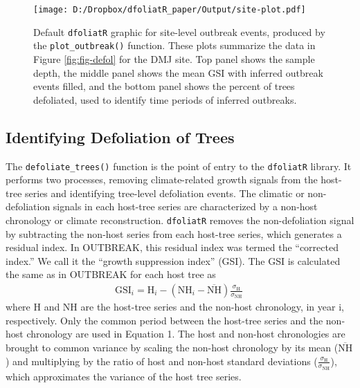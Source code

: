 \documentclass[review]{elsarticle} %
\makeatletter
\def\maxwidth{\ifdim\Gin@nat@width>\linewidth\linewidth
\else\Gin@nat@width\fi}
\let\Oldincludegraphics\includegraphics
\renewcommand{\includegraphics}[1]{\Oldincludegraphics[width=\maxwidth]{#1}}
\makeatother
\begin{document}
\begin{figure}
\centering
\texttt{[image: D:/Dropbox/dfoliatR\_paper/Output/site-plot.pdf]}
\caption{\label{fig:fig-obr}Default \texttt{dfoliatR} graphic for site-level outbreak events, produced by the \texttt{plot\_outbreak()} function. These plots summarize the data in Figure \ref{fig:fig-defol} for the DMJ site. Top panel shows the sample depth, the middle panel shows the mean GSI with inferred outbreak events filled, and the bottom panel shows the percent of trees defoliated, used to identify time periods of inferred outbreaks.}
\end{figure}

\hypertarget{identifying-defoliation-of-trees}{%
\subsection{Identifying Defoliation of Trees}\label{identifying-defoliation-of-trees}}

The \texttt{defoliate\_trees()} function is the point of entry to the \texttt{dfoliatR} library. It performs two processes, removing climate-related growth signals from the host-tree series and identifying tree-level defoliation events. The climatic or non-defoliation signals in each host-tree series are characterized by a non-host chronology or climate reconstruction. \texttt{dfoliatR} removes the non-defoliation signal by subtracting the non-host series from each host-tree series, which generates a residual index. In OUTBREAK, this residual index was termed the ``corrected index.'' We call it the ``growth suppression index'' (GSI). The GSI is calculated the same as in OUTBREAK for each host tree as
\begin{align}
\textrm{GSI}_{i} = \textrm{H}_{i} - \left( \textrm{NH}_{i} - \overline{\textrm{NH}} \right) \frac{\sigma_{\textrm{H}}}{\sigma_{\textrm{NH}}} \
\end{align}
where H and NH are the host-tree series and the non-host chronology, in year i, respectively. Only the common period between the host-tree series and the non-host chronology are used in Equation 1. The host and non-host chronologies are brought to common variance by scaling the non-host chronology by its mean (\(\overline{\textrm{NH}}\)) and multiplying by the ratio of host and non-host standard deviations (\(\frac{\sigma_{\textrm{H}}}{\sigma_{\textrm{NH}}}\)), which approximates the variance of the host tree series.
\end{document}
